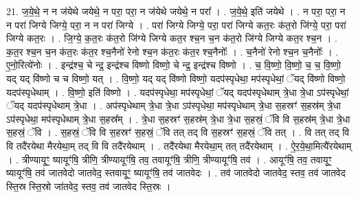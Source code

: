 \documentclass[17pt]{extarticle}
\begin{document}
21. ज॒ये॒थे॒ न न ज॑येथे जयेथे॒ न परा॒ परा॒ न ज॑येथे जयेथे॒ न परा᳚ । . ज॒ये॒थे॒ इति॑ जयेथे । . न परा॒ परा॒ न न परा॑ जिग्ये जिग्ये॒ परा॒ न न परा॑ जिग्ये । . परा॑ जिग्ये जिग्ये॒ परा॒ परा॑ जिग्ये कत॒रः क॑त॒रो जि॑ग्ये॒ परा॒ परा॑ जिग्ये कत॒रः । . जि॒ग्ये॒ क॒त॒रः क॑त॒रो जि॑ग्ये जिग्ये कत॒र श्च॒न च॒न क॑त॒रो जि॑ग्ये जिग्ये कत॒र श्च॒न । . क॒त॒र श्च॒न च॒न क॑त॒रः क॑त॒र श्च॒नैनो॑ रेनो श्च॒न क॑त॒रः क॑त॒र श्च॒नैनोः᳚ । . च॒नैनो॑ रेनो श्च॒न च॒नैनोः᳚ । . ए॒नो॒रित्ये॑नोः । . इन्द्र॑श्च॒ चे न्द्र॒ इन्द्र॑श्च विष्णो विष्णो॒ चे न्द्र॒ इन्द्र॑श्च विष्णो । . च॒ वि॒ष्णो॒ वि॒ष्णो॒ च॒ च॒ वि॒ष्णो॒ यद् यद् वि॑ष्णो च च विष्णो॒ यत् । . वि॒ष्णो॒ यद् यद् वि॑ष्णो विष्णो॒ यदप॑स्पृधेथा॒ मप॑स्पृधेथां॒ ॅयद् वि॑ष्णो विष्णो॒ यदप॑स्पृधेथाम् । . वि॒ष्णो॒ इति॑ विष्णो । . यदप॑स्पृधेथा॒ मप॑स्पृधेथां॒ ॅयद् यदप॑स्पृधेथाम् त्रे॒धा त्रे॒धा ऽप॑स्पृधेथां॒ ॅयद् यदप॑स्पृधेथाम् त्रे॒धा । . अप॑स्पृधेथाम् त्रे॒धा त्रे॒धा ऽप॑स्पृधेथा॒ मप॑स्पृधेथाम् त्रे॒धा स॒हस्रꣳ॑ स॒हस्र॑म् त्रे॒धा ऽप॑स्पृधेथा॒ मप॑स्पृधेथाम् त्रे॒धा स॒हस्र᳚म् । . त्रे॒धा स॒हस्रꣳ॑ स॒हस्र॑म् त्रे॒धा त्रे॒धा स॒हस्रं॒ ॅवि वि स॒हस्र॑म् त्रे॒धा त्रे॒धा स॒हस्रं॒ ॅवि । . स॒हस्रं॒ ॅवि वि स॒हस्रꣳ॑ स॒हस्रं॒ ॅवि तत् तद् वि स॒हस्रꣳ॑ स॒हस्रं॒ ॅवि तत् । . वि तत् तद् वि वि तदै॑रयेथा मैरयेथा॒म् तद् वि वि तदै॑रयेथाम् । . तदै॑रयेथा मैरयेथा॒म् तत् तदै॑रयेथाम् । . ऐ॒र॒ये॒था॒मित्यै॑रयेथाम् । . त्रीण्यायूꣳ॒॒ ष्यायूꣳ॑षि॒ त्रीणि॒ त्रीण्यायूꣳ॑षि॒ तव॒ तवायूꣳ॑षि॒ त्रीणि॒ त्रीण्यायूꣳ॑षि॒ तव॑ । . आयूꣳ॑षि॒ तव॒ तवायूꣳ॒॒ ष्यायूꣳ॑षि॒ तव॑ जातवेदो जातवेद॒ स्तवायूꣳ॒॒ ष्यायूꣳ॑षि॒ तव॑ जातवेदः । . तव॑ जातवेदो जातवेद॒ स्तव॒ तव॑ जातवेद स्ति॒स्र स्ति॒स्रो जा॑तवेद॒ स्तव॒ तव॑ जातवेद स्ति॒स्रः । \newline
\end{document}

